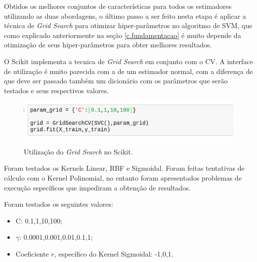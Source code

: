 Obtidos os melhores conjuntos de características para todos os estimadores utilizando as duas abordagens, o último passo a ser feito nesta etapa é aplicar a técnica de \textit{Grid Search} para otimizar hiper-parâmetros no algoritmo de SVM, que como explicado anteriormente na seção \ref{c.fundamentacao} é muito depende da otimização de seus hiper-parâmetros para obter melhores resultados.

O Scikit implementa a tecnica de \textit{Grid Search} em conjunto com o CV. A interface de utilização é muito parecida com a de um estimador normal, com a diferença de que deve ser passado também um dicionário com os parâmetros que serão testados e seus respectivos valores.

\begin{figure}[h]
\caption{\small Utilização do \textit{Grid Search} no Scikit.}
\centering
\includegraphics[scale=0.80]{figs/gridsearch.png}
\label{f.exemplo-gridsearch}
\end{figure}

Foram testados os Kernels Linear, RBF e Sigmoidal. Foram feitas tentativas de cálculo com o Kernel Polinomial, no entanto foram apresentados problemas de execução específicos que impediram a obtenção de resultados.

Foram testados os seguintes valores:

\begin{itemize}
    \item C: {0.1,1,10,100};
    \item $\gamma$: {0.0001,0.001,0.01,0.1,1};
    \item Coeficiente $r$, específico do Kernel Sigmoidal: {-1,0,1}.
\end{itemize}

